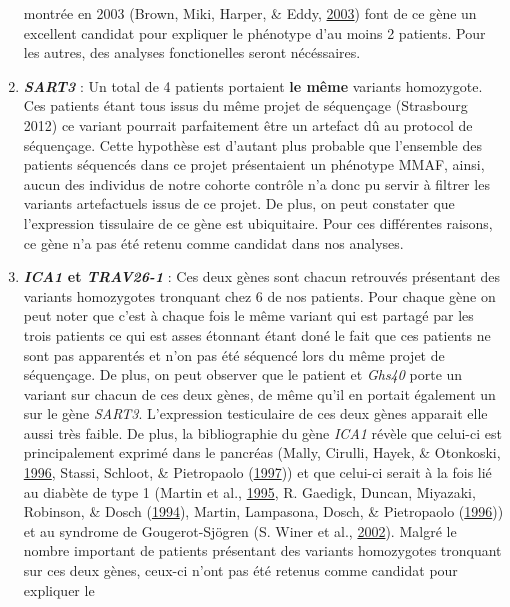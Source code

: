 \documentclass[12pt,twoside]{reedthesis}
\theoremstyle{definition}
\theoremstyle{definition}
\theoremstyle{remark}
\begin{document}
\begin{enumerate}
    montrée en 2003 (Brown, Miki, Harper, \& Eddy,
    \protect\hyperlink{ref-Brown2003}{2003}) font de ce gène un excellent
    candidat pour expliquer le phénotype d'au moins 2 patients. Pour les
    autres, des analyses fonctionelles seront nécéssaires.
  \item
    \textbf{\emph{SART3}} : Un total de 4 patients portaient \textbf{le
    même} variants homozygote. Ces patients étant tous issus du même
    projet de séquençage (Strasbourg 2012) ce variant pourrait
    parfaitement être un artefact dû au protocol de séquençage. Cette
    hypothèse est d'autant plus probable que l'ensemble des patients
    séquencés dans ce projet présentaient un phénotype MMAF, ainsi, aucun
    des individus de notre cohorte contrôle n'a donc pu servir à filtrer
    les variants artefactuels issus de ce projet. De plus, on peut
    constater que l'expression tissulaire de ce gène est ubiquitaire. Pour
    ces différentes raisons, ce gène n'a pas été retenu comme candidat
    dans nos analyses.
  \item
    \textbf{\emph{ICA1} et \emph{TRAV26-1}} : Ces deux gènes sont chacun
    retrouvés présentant des variants homozygotes tronquant chez 6 de nos
    patients. Pour chaque gène on peut noter que c'est à chaque fois le
    même variant qui est partagé par les trois patients ce qui est asses
    étonnant étant doné le fait que ces patients ne sont pas apparentés et
    n'on pas été séquencé lors du même projet de séquençage. De plus, on
    peut observer que le patient et \emph{Ghs40} porte un variant sur
    chacun de ces deux gènes, de même qu'il en portait également un sur le
    gène \emph{SART3}. L'expression testiculaire de ces deux gènes
    apparait elle aussi très faible. De plus, la bibliographie du gène
    \emph{ICA1} révèle que celui-ci est principalement exprimé dans le
    pancréas (Mally, Cirulli, Hayek, \& Otonkoski,
    \protect\hyperlink{ref-Mally1996}{1996}, Stassi, Schloot, \&
    Pietropaolo (\protect\hyperlink{ref-Stassi1997}{1997})) et que
    celui-ci serait à la fois lié au diabète de type 1 (Martin et al.,
    \protect\hyperlink{ref-Martin1995}{1995}, R. Gaedigk, Duncan,
    Miyazaki, Robinson, \& Dosch
    (\protect\hyperlink{ref-Gaedigk1994}{1994}), Martin, Lampasona, Dosch,
    \& Pietropaolo (\protect\hyperlink{ref-Martin1996}{1996})) et au
    syndrome de Gougerot-Sjögren (S. Winer et al.,
    \protect\hyperlink{ref-Winer2002}{2002}). Malgré le nombre important
    de patients présentant des variants homozygotes tronquant sur ces deux
    gènes, ceux-ci n'ont pas été retenus comme candidat pour expliquer le

\end{enumerate}
\end{document}
